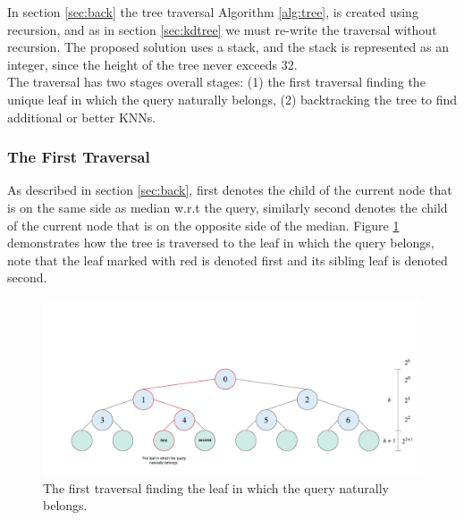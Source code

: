In section \ref{sec:back} the tree traversal Algorithm \ref{alg:tree}, is created using recursion, and as in section \ref{sec:kdtree} we must re-write the traversal without recursion. The proposed solution uses a stack, and the stack is represented as an integer, since the height of the tree never exceeds 32. 
\\[2mm]
The traversal has two stages overall stages: (1) the first traversal finding the unique leaf in which the query naturally belongs, (2) backtracking the tree to find additional or better KNNs. 

\subsubsection{The First Traversal}

As described in section \ref{sec:back}, first denotes the child of the current node that is on the same side as median w.r.t the query, similarly second denotes the child of the current node that is on the opposite side of the median. 
Figure \ref{fig:t1} demonstrates how the tree is traversed to the leaf in which the query belongs, note that the leaf marked with red is denoted first and its sibling leaf is denoted second. 

\begin{figure}[H]
\centering
\includegraphics[width=1\textwidth]{pics/kd-tree-visual/22.png}
\caption{The first traversal finding the leaf in which the query naturally belongs.}
\label{fig:t1}
\end{figure}



